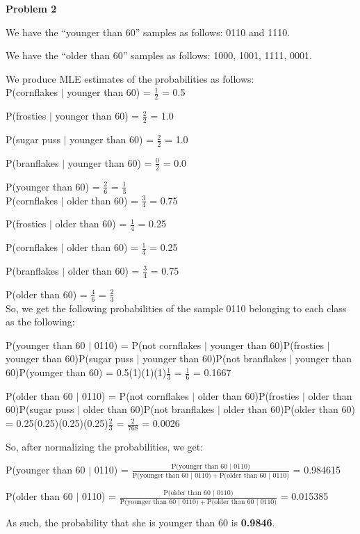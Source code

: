 \pagebreak\textbf{Problem 2}

We have the ``younger than 60'' samples as follows: 0110 and 1110.

We have the ``older than 60'' samples as follows: 1000, 1001, 1111, 0001.

We produce MLE estimates of the probabilities as follows: \\

P(cornflakes $\vert$ younger than 60) = $\frac{1}{2}$ = 0.5

P(frosties $\vert$ younger than 60) = $\frac{2}{2}$ = 1.0

P(sugar puss $\vert$ younger than 60) = $\frac{2}{2}$ = 1.0

P(branflakes $\vert$ younger than 60) = $\frac{0}{2}$ = 0.0

P(younger than 60) = $\frac{2}{6}$ = $\frac{1}{3}$ \\

P(cornflakes $\vert$ older than 60) = $\frac{3}{4}$ = 0.75

P(frosties $\vert$ older than 60) = $\frac{1}{4}$ = 0.25

P(cornflakes $\vert$ older than 60) = $\frac{1}{4}$ = 0.25

P(branflakes $\vert$ older than 60) = $\frac{3}{4}$ = 0.75

P(older than 60) = $\frac{4}{6}$ = $\frac{2}{3}$ \\

So, we get the following probabilities of the sample 0110 belonging to each class as the following:

P(younger than 60 $\vert$ 0110) = P(not cornflakes $\vert$ younger than 60)P(frosties $\vert$ younger than 60)P(sugar puss $\vert$ younger than 60)P(not branflakes $\vert$ younger than 60)P(younger than 60) = 0.5(1)(1)(1)$\frac{1}{3}$ = $\frac{1}{6}$ = 0.1667

P(older than 60 $\vert$ 0110) = P(not cornflakes $\vert$ older than 60)P(frosties $\vert$ older than 60)P(sugar puss $\vert$ older than 60)P(not branflakes $\vert$ older than 60)P(older than 60) = 0.25(0.25)(0.25)(0.25)$\frac{2}{3}$ = $\frac{2}{768}$ = 0.0026

So, after normalizing the probabilities, we get:

P(younger than 60 $\vert$ 0110) = $\frac{\text{P(younger than 60 $\vert$ 0110)}}{\text{P(younger than 60 $\vert$ 0110)} + \text{P(older than 60 $\vert$ 0110)}}$ = 0.984615

P(older than 60 $\vert$ 0110) = $\frac{\text{P(older than 60 $\vert$ 0110)}}{\text{P(younger than 60 $\vert$ 0110)} + \text{P(older than 60 $\vert$ 0110)}}$ = 0.015385

As such, the probability that she is younger than 60 is \textbf{0.9846}.